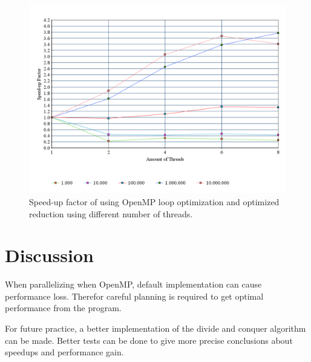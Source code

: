 \documentclass[a4paper,12px]{article}
\begin{document}
\begin{figure}[H]
    \centering
    \includegraphics[width=\textwidth]{reduce2}
    \caption{Speed-up factor of using OpenMP loop optimization and optimized
    reduction using different number of threads.}
\end{figure}


\section{Discussion}

When parallelizing when OpenMP, default implementation can cause performance
loss. Therefor careful planning is required to get optimal performance from the
program.

For future practice, a better implementation of the divide and conquer algorithm
can be made. Better tests can be done to give more precise conclusions about
speedups and performance gain.



%
%
\end{document}
